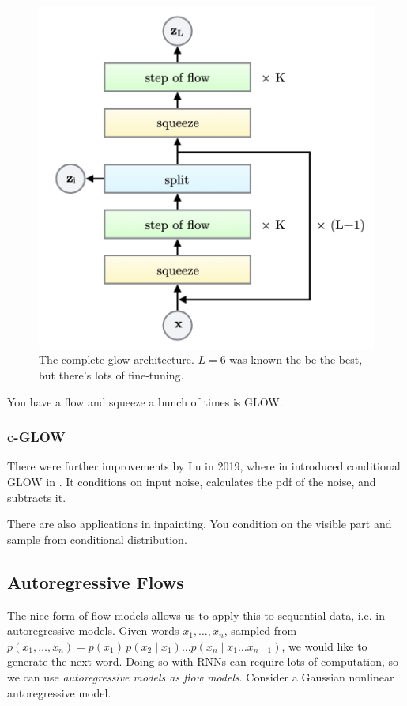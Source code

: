   \begin{figure}[H]
    \centering 
    \includegraphics[scale=0.4]{img/glow_architecture.png}
    \caption{The complete glow architecture. $L = 6$ was known the be the best, but there's lots of fine-tuning. } 
    \label{fig:glow_architecture}
  \end{figure}

  You have a flow and squeeze a bunch of times is GLOW. 

  \subsubsection{c-GLOW} 
  
    There were further improvements by Lu in 2019, where in introduced conditional GLOW in \cite{cglow}. It conditions on input noise, calculates the pdf of the noise, and subtracts it. 

    There are also applications in inpainting. You condition on the visible part and sample from conditional distribution. 


\subsection{Autoregressive Flows} 

  The nice form of flow models allows us to apply this to sequential data, i.e. in autoregressive models. Given words $x_1, \ldots, x_n$, sampled from $p(x_1, \ldots, x_n) = p(x_1) \, p(x_2 \mid x_1) \ldots p(x_n \mid x_1 \ldots x_{n-1})$, we would like to generate the next word. Doing so with RNNs can require lots of computation, so we can use \textit{autoregressive models as flow models}. Consider a Gaussian nonlinear autoregressive model. 

